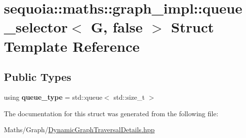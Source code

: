 \hypertarget{structsequoia_1_1maths_1_1graph__impl_1_1queue__selector_3_01_g_00_01false_01_4}{}\section{sequoia\+::maths\+::graph\+\_\+impl\+::queue\+\_\+selector$<$ G, false $>$ Struct Template Reference}
\label{structsequoia_1_1maths_1_1graph__impl_1_1queue__selector_3_01_g_00_01false_01_4}
\subsection*{Public Types}
\begin{DoxyCompactItemize}
\item 
\mbox{\label{structsequoia_1_1maths_1_1graph__impl_1_1queue__selector_3_01_g_00_01false_01_4_a97e5d4dfb08d5e1bc92247955f94eb32}} 
using {\bfseries queue\+\_\+type} = std\+::queue$<$ std\+::size\+\_\+t $>$
\end{DoxyCompactItemize}


The documentation for this struct was generated from the following file\+:\begin{DoxyCompactItemize}
\item 
Maths/\+Graph/\mbox{\hyperlink{_dynamic_graph_traversal_details_8hpp}{Dynamic\+Graph\+Traversal\+Details.\+hpp}}\end{DoxyCompactItemize}
